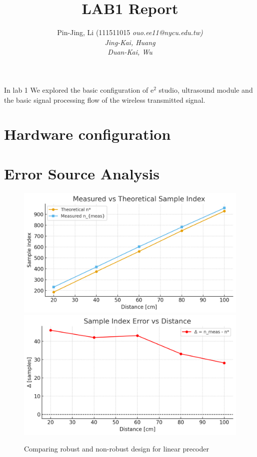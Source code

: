 \documentclass[10pt]{article}
\title{\vspace{-0.2em} \huge LAB1 Report}
\author{Pin-Jing, Li (111511015 \it{ouo.ee11@nycu.edu.tw})\\ 
Jing-Kai, Huang\\ 
Duan-Kai, Wu}
\begin{document}
\maketitle


In lab 1 We explored the basic configuration of $\mathrm{e}^2$ studio, ultrasound module and the basic signal processing flow of the wireless transmitted signal.



\section{Hardware configuration}


\section{Error Source Analysis}

\begin{figure}[!h]
	\centering 
	 {
		\includegraphics[width = .45\columnwidth]{fig/distance_vs_sample_theo_meas.png}	
	}
	 {
		\includegraphics[width = .45\columnwidth]{fig/distance_vs_delta.png}
	}
	\caption{Comparing robust and non-robust design for linear precoder}
\label{fig:robust_lin}
\end{figure}
\end{document}
